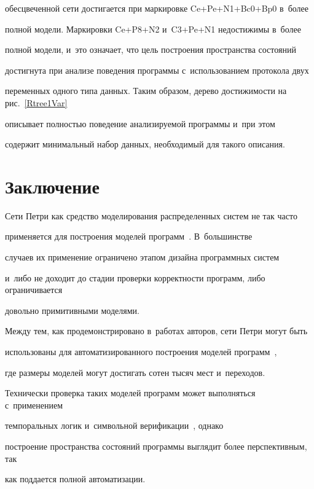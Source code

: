 обес\-цве\-чен\-ной сети до\-сти\-га\-ет\-ся при маркировке Ce\;+\;Pe\;+\;N1\;+\;Bc0\;+\;Bp0 в~более 


пол\-ной модели. Маркировки  Ce\;+\;P8\;+\;N2 и~C3\;+\;Pe\;+\;N1 недостижимы в~более 


пол\-ной модели, и~это означает, что цель по\-стро\-ения пространства со\-сто\-яний 


достигнута при анализе поведения программы с~использованием протокола двух 


переменных одного типа данных. Таким образом, дерево достижимости на рис.~\ref{Rtree1Var} 


описывает пол\-ностью поведение ана\-ли\-зи\-ру\-емой программы и~при этом 


содержит минимальный набор данных, необходимый для такого описания.





\section {Заключение}





Сети Петри как средство моделирования распределенных сис\-тем не так час\-то 


применяется для по\-стро\-ения моделей программ~\cite{Denaro:2003}. В~большинстве 


случаев их применение ограничено этапом дизайна программных сис\-тем


и~либо не доходит до стадии проверки корректности программ, либо ограничивается 


довольно примитивными моделями.


Между тем, как продемонстрировано в~работах авторов, сети Пет\-ри могут быть 


использованы для автоматизированного по\-стро\-ения моделей программ~\cite{Kharitonov:2011:MFC}, 


где размеры моделей могут до\-сти\-гать сотен тысяч мест и~переходов.


Технически проверка таких моделей программ может выполняться с~применением 


темпоральных логик и~символьной верификации~\cite{Latvala:2004}, однако 


по\-стро\-ение пространства со\-сто\-яний программы выглядит более перспективным, так 


как поддается пол\-ной автоматизации.





